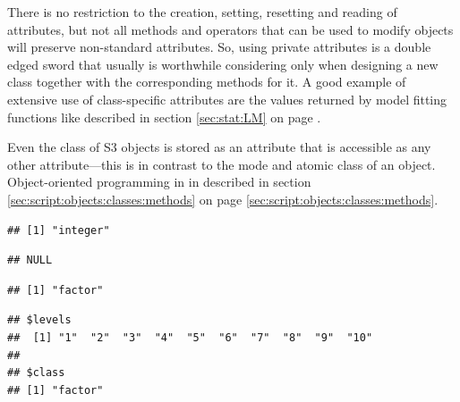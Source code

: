 \documentclass[krantz2]{krantz}\usepackage{knitr}%
\begin{document}
\begin{warningbox}
There is no restriction to the creation, setting, resetting and reading of attributes, but not all methods and operators that can be used to modify objects will preserve non-standard attributes. So, using private attributes is a double edged sword that usually is worthwhile considering only when designing a new class together with the corresponding methods for it. A good example of extensive use of class-specific attributes are the values returned by model fitting functions like  described in section \ref{sec:stat:LM} on page \pageref{sec:stat:LM}.

Even the class of S3 objects is stored as an attribute that is accessible as any other attribute---this is in contrast to the mode and atomic class of an object. Object-oriented programming in \Rlang in described in section \ref{sec:script:objects:classes:methods} on page \ref{sec:script:objects:classes:methods}.

\begin{knitrout}\footnotesize
{}\color{fgcolor}\begin{kframe}
\begin{alltt}
 \hlkwb{<-} \hlopt{:}
\end{alltt}
\begin{verbatim}
## [1] "integer"
\end{verbatim}
\begin{alltt}
\end{alltt}
\begin{verbatim}
## NULL
\end{verbatim}
\end{kframe}
\end{knitrout}

\begin{knitrout}\footnotesize
{}\color{fgcolor}\begin{kframe}
\begin{alltt}
 \hlkwb{<-} 
\end{alltt}
\begin{verbatim}
## [1] "factor"
\end{verbatim}
\begin{alltt}
\end{alltt}
\begin{verbatim}
## $levels
##  [1] "1"  "2"  "3"  "4"  "5"  "6"  "7"  "8"  "9"  "10"
## 
## $class
## [1] "factor"
\end{verbatim}
\end{kframe}
\end{knitrout}
\end{warningbox}
\end{document}
